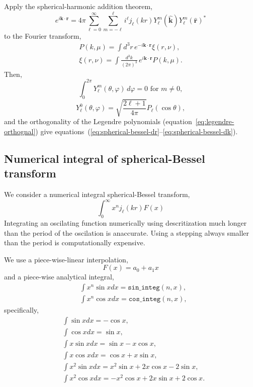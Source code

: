 \documentclass[a4paper,11pt, fleqn]{article}
\begin{document}
\vspace{5mm}

Apply the spherical-harmonic addition theorem,
%
\begin{equation}
  e^{i\bm{k}\cdot\bm{r}} = 4\pi \sum_{\ell=0}^\infty \sum_{m=-\ell}^\ell
  i^\ell j_\ell(kr) Y_\ell^m(\hat{\bm{k}}) Y_\ell^m(\hat{\bm{r}})^*
\end{equation}
%
to the Fourier transform,
%
\begin{align}
  P(k, \mu) = \int \!\! d^3 r \, e^{-i\bm{k}\cdot\bm{r}} \xi(r, \nu),\\
  \xi(r, \nu) = \int \!\! \frac{d^3 k}{(2\pi)^3} \, e^{i\bm{k}\cdot\bm{r}} P(k, \mu).
\end{align}
%
Then,
%
\begin{equation}
  \int_0^{2\pi} \! Y_\ell^m(\theta, \varphi) \, d \varphi = 0
  \mbox{ for $m \neq 0$},
\end{equation}
%
\begin{equation}
  Y_\ell^0(\theta, \varphi) = \sqrt{\frac{2\ell + 1}{4\pi}} P_\ell(\cos\theta),
\end{equation}
%
and the orthogonality of the Legendre polynomials
(equation~\ref{eq:legendre-orthognal}) give
equations~(\ref{eq:spherical-bessel-dr}--\ref{eq:spherical-bessel-dk}).

\clearpage
\subsection{Numerical integral of spherical-Bessel transform}

We consider a numerical integral spherical-Bessel transform,
%
\begin{equation}
  \int_0^\infty x^n j_\ell(kr) F(x)
\end{equation}
%
Integrating an oscilating function numerically using descritization
much longer than the period of the oscilation is anaccurate. Using a
stepping always smaller than the period is computationally
expensive.

We use a piece-wise-linear interpolation,
%
\begin{equation}
  F(x) = a_0 + a_1 x
\end{equation}
%
and a piece-wise analytical integral,
%
\begin{align}
  &\int x^n \sin x dx = \texttt{sin\_integ}(n, x),\\
  &\int x^n \cos x dx = \texttt{cos\_integ}(n, x),
\end{align}
%
specifically,
%
\begin{align}
  &\int \sin x dx = -\cos x,\\
  &\int \cos x dx = \sin x,\\
  &\int x \sin x dx = \sin x - x \cos x,\\
  &\int x \cos x dx = \cos x + x \sin x,\\
  &\int x^2 \sin x dx = x^2 \sin x + 2 x \cos x - 2 \sin x,\\
  &\int x^2 \cos x dx = -x^2 \cos x + 2 x \sin x + 2 \cos x.
\end{align}
%
\end{document}
